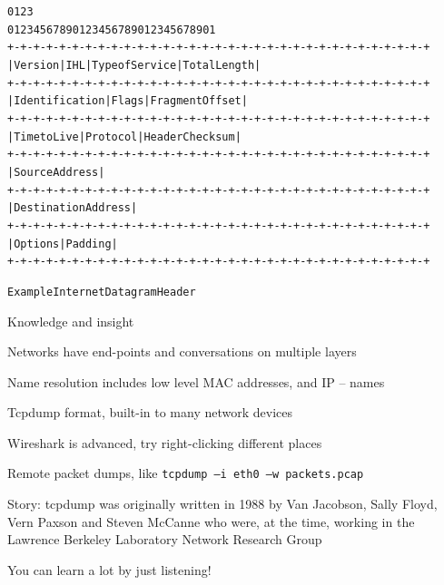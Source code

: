 \documentclass[Screen16to9,17pt]{foils}
\begin{document}

\begin{alltt}
\small
    0                   1                   2                   3
    0 1 2 3 4 5 6 7 8 9 0 1 2 3 4 5 6 7 8 9 0 1 2 3 4 5 6 7 8 9 0 1
   +-+-+-+-+-+-+-+-+-+-+-+-+-+-+-+-+-+-+-+-+-+-+-+-+-+-+-+-+-+-+-+-+
   |Version|  IHL  |Type of Service|          Total Length         |
   +-+-+-+-+-+-+-+-+-+-+-+-+-+-+-+-+-+-+-+-+-+-+-+-+-+-+-+-+-+-+-+-+
   |         Identification        |Flags|      Fragment Offset    |
   +-+-+-+-+-+-+-+-+-+-+-+-+-+-+-+-+-+-+-+-+-+-+-+-+-+-+-+-+-+-+-+-+
   |  Time to Live |    Protocol   |         Header Checksum       |
   +-+-+-+-+-+-+-+-+-+-+-+-+-+-+-+-+-+-+-+-+-+-+-+-+-+-+-+-+-+-+-+-+
   |                       Source Address                          |
   +-+-+-+-+-+-+-+-+-+-+-+-+-+-+-+-+-+-+-+-+-+-+-+-+-+-+-+-+-+-+-+-+
   |                    Destination Address                        |
   +-+-+-+-+-+-+-+-+-+-+-+-+-+-+-+-+-+-+-+-+-+-+-+-+-+-+-+-+-+-+-+-+
   |                    Options                    |    Padding    |
   +-+-+-+-+-+-+-+-+-+-+-+-+-+-+-+-+-+-+-+-+-+-+-+-+-+-+-+-+-+-+-+-+

                    Example Internet Datagram Header
\end{alltt}



Knowledge and insight
\begin{list2}
\item Networks have end-points and conversations on multiple layers
\item Name resolution includes low level MAC addresses, and IP -- names
\item Tcpdump format, built-in to many network devices
\item Wireshark is advanced, try right-clicking different places
\item Remote packet dumps, like \verb+tcpdump –i eth0 –w packets.pcap+
\item Story: tcpdump was originally written in 1988 by Van Jacobson, Sally Floyd, Vern Paxson and Steven McCanne who were, at the time, working in the Lawrence Berkeley Laboratory Network Research Group\\
\end{list2}

\vskip 5mm

You can learn a lot by just listening!
\end{document}
